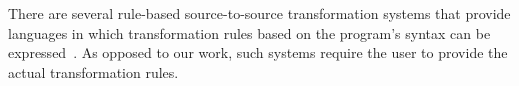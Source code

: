 \documentclass[conference]{IEEEtran}
\begin{document}





There are several rule-based source-to-source transformation systems that
provide languages in which transformation rules based on the program's
syntax can be expressed~\cite{stratego,txl}.  As opposed to our work, such
systems require the user to provide the actual transformation rules.

\end{document}
